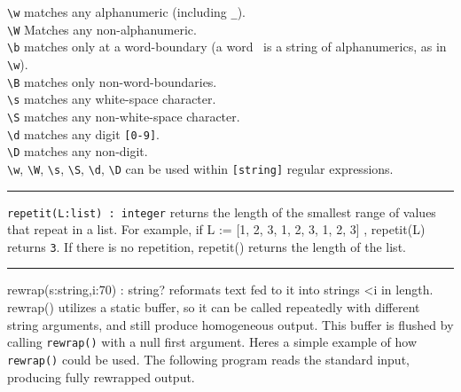 \texttt{{\textbackslash}w} matches any alphanumeric (including
\texttt{{\textquotedbl}\_{\textquotedbl}}).\\
\texttt{{\textbackslash}W} Matches any non-alphanumeric.\\
\texttt{{\textbackslash}b} matches only at a word-boundary (a word \ is
a string of alphanumerics, as in \texttt{{\textbackslash}w}).\\
\texttt{{\textbackslash}B} matches only non-word-boundaries.\\
\texttt{{\textbackslash}s} matches any white-space character.\\
\texttt{{\textbackslash}S} matches any non-white-space
character.\\
\texttt{{\textbackslash}d} matches any digit \texttt{[0-9]}.\\
\texttt{{\textbackslash}D} matches any non-digit.\\
\texttt{{\textbackslash}w}, \texttt{{\textbackslash}W},
\texttt{{\textbackslash}s}, \texttt{{\textbackslash}S},
\texttt{{\textbackslash}d}, \texttt{{\textbackslash}D} can be used
within \texttt{[string]} regular expressions.

\vspace{0.25cm}\hrule{}

\texttt{repetit(L:list) : integer} returns the length of the smallest
range of values that repeat in a list. For example, if L := [1, 2, 3,
1, 2, 3, 1, 2, 3] , \textsf{repetit(L)} returns \texttt{3}. If there is
no repetition, \textsf{repetit()} returns the length of the list. 

\vspace{0.25cm}\hrule{}

\textsf{rewrap(s:string,i:70) : string?} reformats text fed to it into
strings \textsf{{\textless}i} in length. \textsf{rewrap()} utilizes a
static buffer, so it can be called repeatedly with different string
arguments, and still produce homogeneous output. This buffer is flushed
by calling \texttt{rewrap()} with a null first argument.
Here{\textquotesingle}s a simple example of how \texttt{rewrap()} could
be used. The following program reads the standard input, producing
fully rewrapped output.


